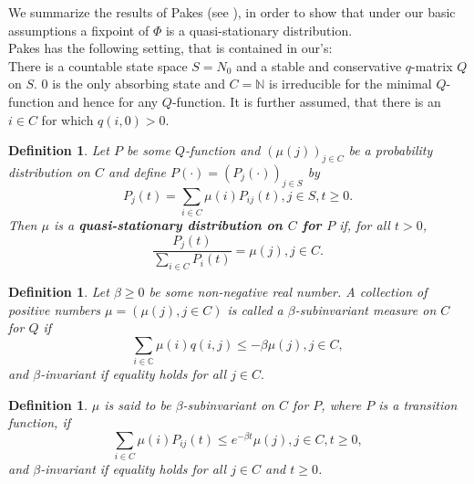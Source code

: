\documentclass[12pt,a4paper]{scrartcl}
\newtheorem{definition}[theorem]{Definition}
\numberwithin{equation}{section}
\newcommand{\C}{\mathbb{C}} %
\newcommand{\N}{\mathbb{N}} %
\begin{document}
We summarize the results of Pakes (see \cite{pakes}), in order to show that under our basic assumptions a fixpoint of $\Phi$ is a quasi-stationary distribution.\\[2ex]

Pakes has the following setting, that is contained in our's:\\
There is a countable state space $S = N_0$ and a stable and conservative $q$-matrix $Q$ on $S$. $0$ is the only absorbing state and $C = \N$  is irreducible for the minimal $Q$-function and hence for any $Q$-function. It is further assumed, that there is an $i \in C$ for which $q\left(i,0\right) > 0.$

\begin{definition}
Let $P$ be some $Q$-function and $\left(\mu\left(j\right)\right)_{j \in C}$ be a probability distribution on $C$ and define $P\left(\cdot\right) = \left(P_j\left(\cdot\right)\right)_{j \in S}$ by
\begin{equation*}
P_j\left(t\right) = \sum_{i \in C} \mu\left(i\right) P_{ij}\left(t\right), j \in S, t \geq 0.
\end{equation*}
Then $\mu$ is a \textbf{quasi-stationary distribution on $C$ for $P$} if, for all $t > 0$,
\begin{equation*}
\frac{P_j\left(t\right)}{\sum_{i \in C}P_i\left(t\right)} = \mu\left(j\right), j \in C.
\end{equation*}
\end{definition}

\begin{definition}
Let $\beta \geq 0$ be some non-negative real number. A collection of positive numbers $ \mu = \left(\mu\left(j\right), j \in C\right)$ is called a $\beta$-subinvariant measure on $C$ for $Q$ if
\begin{equation}
\sum_{i \in \C} \mu\left(i\right) q\left(i,j\right) \leq -\beta \mu\left(j\right), j \in C,
\end{equation}
and $\beta$-invariant if equality holds for all $j \in C.$
\end{definition}

\begin{definition}
$\mu$ is said to be $\beta$-subinvariant on $C$ for $P$, where $P$ is a transition function, if
\begin{equation}
\sum_{i \in C} \mu\left(i\right) P_{ij}\left(t\right) \leq e^{-\beta t} \mu\left(j\right), j \in C, t\geq 0,
\end{equation}
and $\beta$-invariant if equality holds for all $j \in C$ and $t\geq 0$.
\end{definition}
\end{document}
